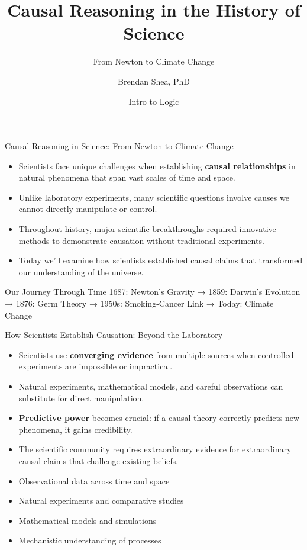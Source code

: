 \documentclass{beamer}
\title{Causal Reasoning in the History of Science}
\subtitle{From Newton to Climate Change}
\author{Brendan Shea, PhD}
\date{Intro to Logic}
\begin{document}
	
	\frame{\titlepage}
	
	\begin{frame}{Causal Reasoning in Science: From Newton to Climate Change}
		\begin{itemize}
			\item Scientists face unique challenges when establishing \textbf{causal relationships} in natural phenomena that span vast scales of time and space.
			\item Unlike laboratory experiments, many scientific questions involve causes we cannot directly manipulate or control.
			\item Throughout history, major scientific breakthroughs required innovative methods to demonstrate causation without traditional experiments.
			\item Today we'll examine how scientists established causal claims that transformed our understanding of the universe.
		\end{itemize}
		
		\begin{block}{Our Journey Through Time}
			1687: Newton's Gravity → 1859: Darwin's Evolution → 1876: Germ Theory → 1950s: Smoking-Cancer Link → Today: Climate Change
		\end{block}
	\end{frame}
	
	\begin{frame}{How Scientists Establish Causation: Beyond the Laboratory}
		\begin{itemize}
			\item Scientists use \textbf{converging evidence} from multiple sources when controlled experiments are impossible or impractical.
			\item Natural experiments, mathematical models, and careful observations can substitute for direct manipulation.
			\item \textbf{Predictive power} becomes crucial: if a causal theory correctly predicts new phenomena, it gains credibility.
			\item The scientific community requires extraordinary evidence for extraordinary causal claims that challenge existing beliefs.
		\end{itemize}
		
		\begin{example}
			\begin{itemize}
				\item Observational data across time and space
				\item Natural experiments and comparative studies
				\item Mathematical models and simulations
				\item Mechanistic understanding of processes
			\end{itemize}
		\end{example}
	\end{frame}
	
\end{document}
